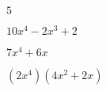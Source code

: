 \documentclass{article}
\begin{document}
\begin{multicols}{2}
$5$\item $10x^{4}-2x^{3}+2$\item $7x^{4}+6x$\item $(2x^{4})(4x^2+2x)$\item 
\end{multicols}
\end{document}

